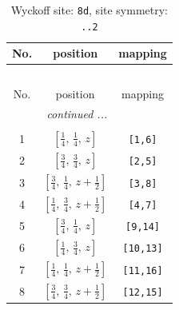 \documentclass[fleqn,8pt]{jsarticle}
\begin{document}
\begin{longtable}{ccc}
\caption{Wyckoff site: {\tt 8d}, site symmetry: {\tt ..2}}
 \\
 \hline \hline
No. & position & mapping \\ \hline \endfirsthead

\multicolumn{2}{l}{\tablename\ \thetable{}} \\
 \hline \hline
No. & position & mapping \\ \hline \endhead

 \hline \hline
\multicolumn{2}{r}{\footnotesize\it continued ...} \\ \endfoot

 \hline \hline
\multicolumn{2}{r}{} \\ \endlastfoot

1 & $\left[ \frac{1}{4},\, \frac{1}{4},\, z \right]$ & {\tt [1,6]} \\ \hline
2 & $\left[ \frac{3}{4},\, \frac{3}{4},\, z \right]$ & {\tt [2,5]} \\ \hline
3 & $\left[ \frac{3}{4},\, \frac{1}{4},\, z + \frac{1}{2} \right]$ & {\tt [3,8]} \\ \hline
4 & $\left[ \frac{1}{4},\, \frac{3}{4},\, z + \frac{1}{2} \right]$ & {\tt [4,7]} \\ \hline
5 & $\left[ \frac{3}{4},\, \frac{1}{4},\, z \right]$ & {\tt [9,14]} \\ \hline
6 & $\left[ \frac{1}{4},\, \frac{3}{4},\, z \right]$ & {\tt [10,13]} \\ \hline
7 & $\left[ \frac{1}{4},\, \frac{1}{4},\, z + \frac{1}{2} \right]$ & {\tt [11,16]} \\ \hline
8 & $\left[ \frac{3}{4},\, \frac{3}{4},\, z + \frac{1}{2} \right]$ & {\tt [12,15]} \\
\end{longtable}
\renewcommand{\arraystretch}{1.2}
\end{document}
